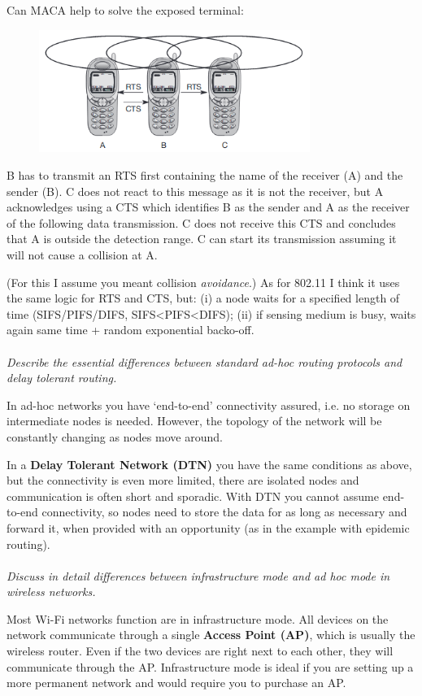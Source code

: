 \documentclass[12pt]{article}
\newcommand*\circled[1]{\tikz[baseline=(char.base)]{
		\node[shape=circle,draw,inner sep=0pt] (char) {#1};}}
\begin{document}
Can MACA help to solve the exposed terminal:
\begin{figure}[H]
    \centering
    \includegraphics[width=250pt]{exposed_terminal.png}
\end{figure}
B has to transmit an RTS first containing the name of the receiver (A) and the
sender (B). C does not react to this message as it is not the receiver, but
A acknowledges using a CTS which identifies B as the sender and A as the
receiver of the following data transmission. C does not receive this CTS and
concludes that A is outside the detection range. C can start its transmission
assuming it will not cause a collision at A.

(For this I assume you meant collision \emph{avoidance}.) As for 802.11 I think
it uses the same logic for RTS and CTS, but: (i) a node waits for a specified
length of time (SIFS/PIFS/DIFS, SIFS<PIFS<DIFS); (ii) if sensing medium is
busy, waits again same time + random exponential backo-off.
\\
\\
\textit{\circled{3.} Describe the essential differences between standard ad-hoc
routing protocols and delay tolerant routing.}

In ad-hoc networks you have `end-to-end' connectivity assured, i.e. no storage
on intermediate nodes is needed. However, the topology of the network will be
constantly changing as nodes move around.

In a \textbf{Delay Tolerant Network (DTN)} you have the same conditions as
above, but the connectivity is even more limited, there are isolated nodes and
communication is often short and sporadic. With DTN you cannot assume
end-to-end connectivity, so nodes need to store the data for as long as
necessary and forward it, when provided with an opportunity (as in the example
with epidemic routing).
\\
\\
\textit{\circled{4.} Discuss in detail differences between infrastructure mode
and ad hoc mode in wireless networks.}

Most Wi-Fi networks function are in infrastructure mode. All devices on the
network communicate through a single \textbf{Access Point (AP)}, which is
usually the wireless router. Even if the two devices are right next to each
other, they will communicate through the AP. Infrastructure mode is ideal if
you are setting up a more permanent network and would require you to purchase
an AP.
\end{document}
